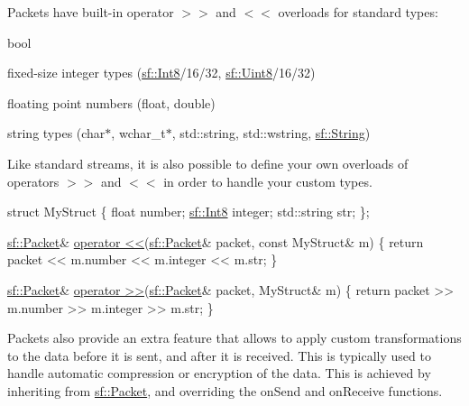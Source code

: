 Packets have built-\/in operator $>$$>$ and $<$$<$ overloads for standard types\-: \begin{DoxyItemize}
\item bool \item fixed-\/size integer types (\hyperlink{namespacesf_a69b109973eac74e22b97e5339bdb68dd}{sf\-::\-Int8}/16/32, \hyperlink{namespacesf_a4ef3d630785c4f296f9b4f274c33d78e}{sf\-::\-Uint8}/16/32) \item floating point numbers (float, double) \item string types (char$\ast$, wchar\-\_\-t$\ast$, std\-::string, std\-::wstring, \hyperlink{classsf_1_1_string}{sf\-::\-String})\end{DoxyItemize}
Like standard streams, it is also possible to define your own overloads of operators $>$$>$ and $<$$<$ in order to handle your custom types.


\begin{DoxyCode}
\textcolor{keyword}{struct }MyStruct
\{
    \textcolor{keywordtype}{float}       number;
    \hyperlink{namespacesf_a69b109973eac74e22b97e5339bdb68dd}{sf::Int8}    integer;
    std::string str;
\};

\hyperlink{classsf_1_1_packet}{sf::Packet}& \hyperlink{classsf_1_1_packet_aa5a465ed02ba29d83ecdafb0ac3fff21}{operator <<}(\hyperlink{classsf_1_1_packet}{sf::Packet}& packet, \textcolor{keyword}{const} MyStruct& m)
\{
    \textcolor{keywordflow}{return} packet << m.number << m.integer << m.str;
\}

\hyperlink{classsf_1_1_packet}{sf::Packet}& \hyperlink{classsf_1_1_packet_af8e26c63ba9bdccd262565ff0d3eeba2}{operator >>}(\hyperlink{classsf_1_1_packet}{sf::Packet}& packet, MyStruct& m)
\{
    \textcolor{keywordflow}{return} packet >> m.number >> m.integer >> m.str;
\}
\end{DoxyCode}


Packets also provide an extra feature that allows to apply custom transformations to the data before it is sent, and after it is received. This is typically used to handle automatic compression or encryption of the data. This is achieved by inheriting from \hyperlink{classsf_1_1_packet}{sf\-::\-Packet}, and overriding the on\-Send and on\-Receive functions.

